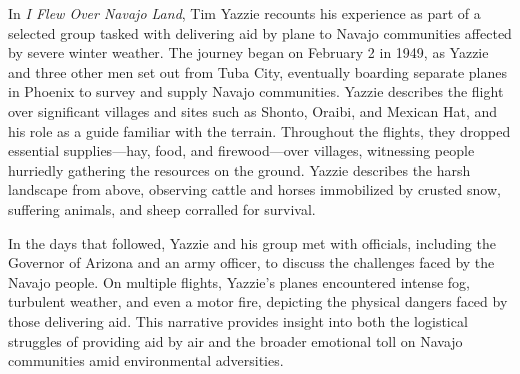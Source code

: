 In \textit{I Flew Over Navajo Land}, Tim Yazzie recounts his experience as part of a selected group tasked with delivering aid by plane to Navajo communities affected by severe winter weather. The journey began on February 2 in 1949, as Yazzie and three other men set out from Tuba City, eventually boarding separate planes in Phoenix to survey and supply Navajo communities. Yazzie describes the flight over significant villages and sites such as Shonto, Oraibi, and Mexican Hat, and his role as a guide familiar with the terrain. Throughout the flights, they dropped essential supplies—hay, food, and firewood—over villages, witnessing people hurriedly gathering the resources on the ground. Yazzie describes the harsh landscape from above, observing cattle and horses immobilized by crusted snow, suffering animals, and sheep corralled for survival.

In the days that followed, Yazzie and his group met with officials, including the Governor of Arizona and an army officer, to discuss the challenges faced by the Navajo people. On multiple flights, Yazzie's planes encountered intense fog, turbulent weather, and even a motor fire, depicting the physical dangers faced by those delivering aid. This narrative provides insight into both the logistical struggles of providing aid by air and the broader emotional toll on Navajo communities amid environmental adversities.